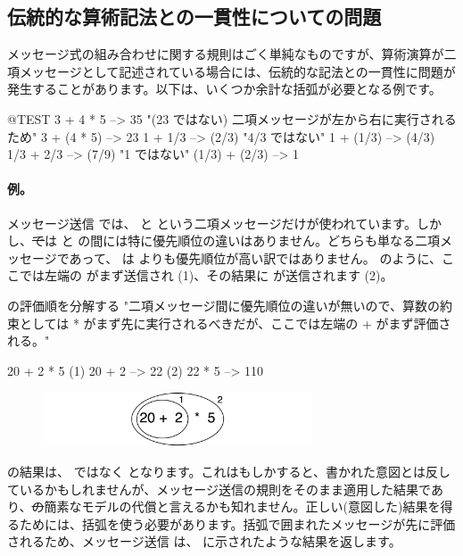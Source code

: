 \documentclass[a4paper,10pt,twoside]{book}
\begin{document}
\subsection{伝統的な算術記法との一貫性についての問題}
メッセージ式の組み合わせに関する規則はごく単純なものですが、算術演算が二項メッセージとして記述されている場合には、伝統的な記法との一貫性に問題が発生することがあります。以下は、いくつか余計な括弧が必要となる例です。

\begin{code}{@TEST}
3 + 4 * 5      --> 35    "(23 ではない)  二項メッセージが左から右に実行されるため"
3 + (4 * 5)    --> 23
1 + 1/3         --> (2/3)    "4/3 ではない"
1 + (1/3)       --> (4/3)
1/3 + 2/3       --> (7/9)    "1 ではない"
(1/3) + (2/3)  --> 1
\end{code}

\paragraph{例。}
メッセージ送信  では、\ct{+} と \ct{*} という二項メッセージだけが使われています。しかし、\st では \ct{+} と \ct{*} の間には特に優先順位の違いはありません。どちらも単なる二項メッセージであって、\ct{*} は \ct{+} よりも優先順位が高い訳ではありません。 のように、ここでは左端の \ct{+} がまず送信され (1)、その結果に \ct{*} が送信されます (2)。

\begin{example}[binaryMessages1]{ の評価順を分解する}{}
"二項メッセージ間に優先順位の違いが無いので、算数の約束としては * がまず先に実行されるべきだが、ここでは左端の + がまず評価される。"

      20 + 2 * 5 
(1)  20 + 2 --> 22
(2)  22       * 5 --> 110
\end{example}

\begin{figure}
\begin{center}\includegraphics[width=8cm]{ucompoNoBracketPar}\end{center}
\end{figure}
\noindent
{}の結果は、 ではなく  となります。これはもしかすると、書かれた意図とは反しているかもしれませんが、メッセージ送信の規則をそのまま適用した結果であり、\st の簡素なモデルの代償と言えるかも知れません。正しい(意図した)結果を得るためには、括弧を使う必要があります。括弧で囲まれたメッセージが先に評価されるため、メッセージ送信  は、 に示されたような結果を返します。
\end{document}
